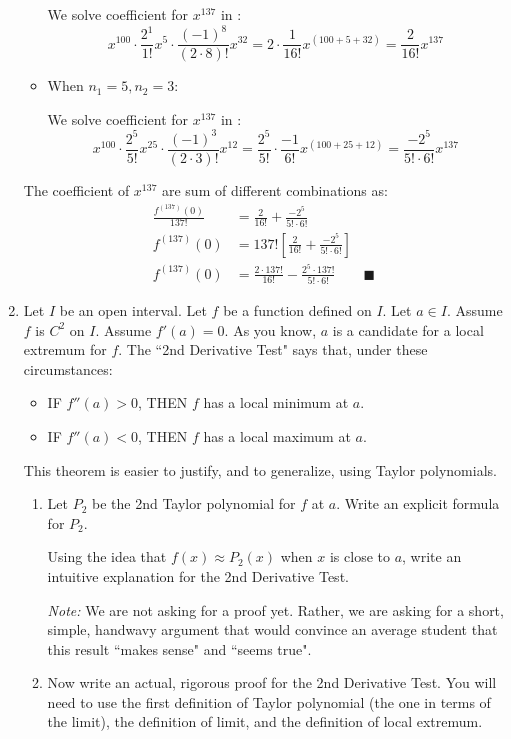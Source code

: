 \documentclass[12pt]{exam}
\newcommand*\circled[1]{\tikz[baseline=(char.base)]{
            \node[shape=circle,draw,inner sep=2pt] (char) {#1};}}
\begin{document}
\begin{enumerate}
\begin{itemize}
    We solve coefficient for $x^{137}$ in \circled{2}:
    $$
        x^{100}\cdot\frac{2^1}{1!}x^{5}\cdot\frac{(-1)^8}{(2\cdot8)!}x^{32}=2\cdot\frac{1}{16!}x^{(100+5+32)}=\frac{2}{16!}x^{137}
    $$
    \item When $n_1=5,n_2=3$:
    
    We solve coefficient for $x^{137}$ in \circled{2}:
    $$
        x^{100}\cdot\frac{2^5}{5!}x^{25}\cdot\frac{(-1)^3}{(2\cdot3)!}x^{12}=\frac{2^5}{5!}\cdot\frac{-1}{6!}x^{(100+25+12)}=\frac{-2^5}{5!\cdot6!}x^{137}
    $$
\end{itemize}
The coefficient of $x^{137}$ are sum of different combinations as:
\begin{align*}
    \frac{f^{(137)}(0)}{137!}&=\frac{2}{16!}+\frac{-2^5}{5!\cdot6!}\\
    f^{(137)}(0)&=137![\frac{2}{16!}+\frac{-2^5}{5!\cdot6!}]\\
    f^{(137)}(0)&=\frac{2\cdot137!}{16!}-\frac{2^5\cdot137!}{5!\cdot6!}\qquad\blacksquare
\end{align*}

\newpage

\item  Let $I$ be an open interval.    Let $f$ be a function defined on $I$.  Let $a \in I$.  Assume $f$ is $C^2$ on $I$.   Assume $f'(a) = 0$.   As you know, $a$ is a candidate for a local extremum for $f$.  The ``2nd Derivative Test" says that, under these circumstances:
	\begin{itemize}
		\item  IF $f''(a)>0$, THEN $f$ has a local minimum at $a$.
		\item  IF $f''(a)<0$, THEN $f$ has a local maximum at $a$.
	\end{itemize}
	 This theorem is easier to justify, and to generalize, using Taylor polynomials.
	\begin{enumerate}
		\item  \label{qu:int} Let $P_2$ be the 2nd Taylor polynomial for $f$ at $a$.  Write an explicit formula for $P_2$.
		
			Using the idea that $f(x) \approx P_2(x)$ when $x$ is close to $a$, write an intuitive explanation for the 2nd Derivative Test.  
			
			\emph{Note:}  We are not asking for a proof yet.  Rather, we are asking for a short, simple, handwavy argument that would convince an average student that this result ``makes sense" and ``seems true".
			
		\item  \label{qu:pf} Now write an actual, rigorous proof for the 2nd Derivative Test.  You will need to use the first definition of Taylor polynomial (the one in terms of the limit), the definition of limit, and the definition of local extremum.
				

\end{enumerate}
\end{enumerate}
\end{document}
